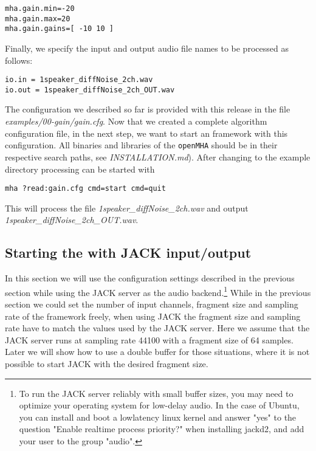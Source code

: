 \begin{verbatim}
mha.gain.min=-20
mha.gain.max=20
mha.gain.gains=[ -10 10 ]
\end{verbatim}

%
Finally, we specify the input and output audio file names to be processed as 
follows:
\begin{verbatim}
io.in = 1speaker_diffNoise_2ch.wav
io.out = 1speaker_diffNoise_2ch_OUT.wav
\end{verbatim}
The configuration we described so far is provided with this release 
in the file \emph{examples/00-gain/gain.cfg}.
Now that we created a complete \mha{} algorithm configuration file,
in the next step, we want to start an \mha{} framework with this configuration.
%
All binaries and libraries of the \verb!openMHA! should be in their respective
search paths, see \emph{INSTALLATION.md}). After changing to the example
directory \mha{} processing can be started with
\begin{verbatim}
mha ?read:gain.cfg cmd=start cmd=quit
\end{verbatim}
%
This will process the file \emph{1speaker\_diffNoise\_2ch.wav} and output 
\emph{1speaker\_diffNoise\_2ch\_OUT.wav}.

\subsection{Starting the \mhad{} with JACK input/output}%
\label{sec:example_jack}%
%
%
%

In this section we will use the configuration settings described in
the previous section while using the JACK server as the audio
backend.\footnote{To run the JACK server reliably with small buffer
  sizes, you may need to optimize your operating system for low-delay
  audio. In the case of Ubuntu, you can install and boot a lowlatency
  linux kernel and answer "yes" to the question "Enable realtime process
  priority?" when installing jackd2, and add your user to the group
  "audio".
}
%
While in the previous section
we could  set the number of 
input channels, fragment size and sampling rate of the framework freely,
when using JACK the fragment size
and sampling rate have to match the values used by the JACK server.
%
Here we assume that the JACK server runs at sampling rate 44100 with a
fragment size of 64 samples.
%
Later we will show how to use a double buffer for those
situations, where it is not possible to start JACK with the desired
fragment size. 

